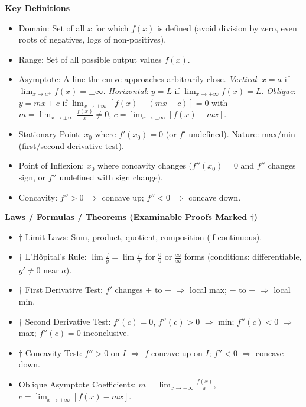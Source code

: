 \documentclass[11pt]{article}
\newcommand{\cle}[1]{{\popxbold\color{popdark}#1}}
\begin{document}
\begin{bilan}
\textbf{Key Definitions}
\begin{itemize}
    \item \cle{Domain}: Set of all $x$ for which $f(x)$ is defined (avoid division by zero, even roots of negatives, logs of non-positives).
    \item \cle{Range}: Set of all possible output values $f(x)$.
    \item \cle{Asymptote}: A line the curve approaches arbitrarily close. \emph{Vertical}: $x=a$ if $\lim_{x\to a^{\pm}}f(x)=\pm\infty$. \emph{Horizontal}: $y=L$ if $\lim_{x\to\pm\infty}f(x)=L$. \emph{Oblique}: $y=mx+c$ if $\lim_{x\to\pm\infty}[f(x)-(mx+c)]=0$ with $m=\lim_{x\to\pm\infty}\frac{f(x)}{x}\neq0$, $c=\lim_{x\to\pm\infty}[f(x)-mx]$.
    \item \cle{Stationary Point}: $x_0$ where $f'(x_0)=0$ (or $f'$ undefined). Nature: max/min (first/second derivative test).
    \item \cle{Point of Inflexion}: $x_0$ where concavity changes ($f''(x_0)=0$ and $f''$ changes sign, or $f''$ undefined with sign change).
    \item \cle{Concavity}: $f''>0$ $\Rightarrow$ concave up; $f''<0$ $\Rightarrow$ concave down.
\end{itemize}

\textbf{Laws / Formulas / Theorems (Examinable Proofs Marked $\dagger$)}
\begin{itemize}
    \item $\dagger$ \cle{Limit Laws}: Sum, product, quotient, composition (if continuous).
    \item $\dagger$ \cle{L'Hôpital's Rule}: $\lim\frac{f}{g}=\lim\frac{f'}{g'}$ for $\frac{0}{0}$ or $\frac{\infty}{\infty}$ forms (conditions: differentiable, $g'\neq0$ near $a$).
    \item $\dagger$ \cle{First Derivative Test}: $f'$ changes $+$ to $-$ $\Rightarrow$ local max; $-$ to $+$ $\Rightarrow$ local min.
    \item $\dagger$ \cle{Second Derivative Test}: $f'(c)=0$, $f''(c)>0$ $\Rightarrow$ min; $f''(c)<0$ $\Rightarrow$ max; $f''(c)=0$ inconclusive.
    \item $\dagger$ \cle{Concavity Test}: $f''>0$ on $I$ $\Rightarrow$ $f$ concave up on $I$; $f''<0$ $\Rightarrow$ concave down.
    \item \cle{Oblique Asymptote Coefficients}: $m=\lim_{x\to\pm\infty}\frac{f(x)}{x}$, $c=\lim_{x\to\pm\infty}[f(x)-mx]$.
\end{itemize}


\end{bilan}
\end{document}
